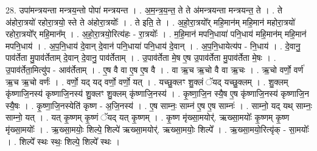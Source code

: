 \documentclass[17pt]{extarticle}
\begin{document}
28. उपा॑मन्त्रयन्ता मन्त्रय॒न्तो पोपा॑ मन्त्रयन्त । . अ॒म॒न्त्र॒य॒न्त॒ ते ते अ॑मन्त्रयन्ता मन्त्रयन्त॒ ते । . ते अ॑होरा॒त्रयो॑ रहोरा॒त्रयो॒ स्ते ते अ॑होरा॒त्रयोः᳚ । . ते इति॒ ते । . अ॒हो॒रा॒त्रयो᳚र् महि॒मान॑म् महि॒मान॑ महोरा॒त्रयो॑ रहोरा॒त्रयो᳚र् महि॒मान᳚म् । . अ॒हो॒रा॒त्रयो॒रित्य॑हः - रा॒त्रयोः᳚ । . म॒हि॒मान॑ मपनि॒धाया॑ पनि॒धाय॑ महि॒मान॑म् महि॒मान॑ मपनि॒धाय॑ । . अ॒प॒नि॒धाय॑ दे॒वान् दे॒वान॑ पनि॒धाया॑ पनि॒धाय॑ दे॒वान् । . अ॒प॒नि॒धायेत्य॑प - नि॒धाय॑ । . दे॒वानु॒ पाव॑र्तेता मु॒पाव॑र्तेताम् दे॒वान् दे॒वानु॒ पाव॑र्तेताम् । . उ॒पाव॑र्तेता मे॒ष ए॒ष उ॒पाव॑र्तेता मु॒पाव॑र्तेता मे॒षः । . उ॒पाव॑र्तेता॒मित्यु॑प - आव॑र्तेताम् । . ए॒ष वै वा ए॒ष ए॒ष वै । . वा ऋ॒च ऋ॒चो वै वा ऋ॒चः । . ऋ॒चो वर्णो॒ वर्ण॑ ऋ॒च ऋ॒चो वर्णः॑ । . वर्णो॒ यद् यद् वर्णो॒ वर्णो॒ यत् । . यच्छु॒क्लꣳ शु॒क्लं ॅयद् यच्छु॒क्लम् । . शु॒क्लम् कृ॑ष्णाजि॒नस्य॑ कृष्णाजि॒नस्य॑ शु॒क्लꣳ शु॒क्लम् कृ॑ष्णाजि॒नस्य॑ । . कृ॒ष्णा॒जि॒न स्यै॒ष ए॒ष कृ॑ष्णाजि॒नस्य॑ कृष्णाजि॒न स्यै॒षः । . कृ॒ष्णा॒जि॒नस्येति॑ कृष्ण - अ॒जि॒नस्य॑ । . ए॒ष साम्नः॒ साम्न॑ ए॒ष ए॒ष साम्नः॑ । . साम्नो॒ यद् यथ् साम्नः॒ साम्नो॒ यत् । . यत् कृ॒ष्णम् कृ॒ष्णं ॅयद् यत् कृ॒ष्णम् । . कृ॒ष्ण मृ॑ख्सा॒मयोर्॑. ऋख्सा॒मयोः᳚ कृ॒ष्णम् कृ॒ष्ण मृ॑ख्सा॒मयोः᳚ । . ऋ॒ख्सा॒मयोः॒ शिल्पे॒ शिल्पे॑ ऋख्सा॒मयोर्॑. ऋख्सा॒मयोः॒ शिल्पे᳚ । . ऋ॒ख्सा॒मयो॒रित्यृ॑क् - सा॒मयोः᳚ । . शिल्पे᳚ स्थः स्थः॒ शिल्पे॒ शिल्पे᳚ स्थः । \newline
\end{document}

